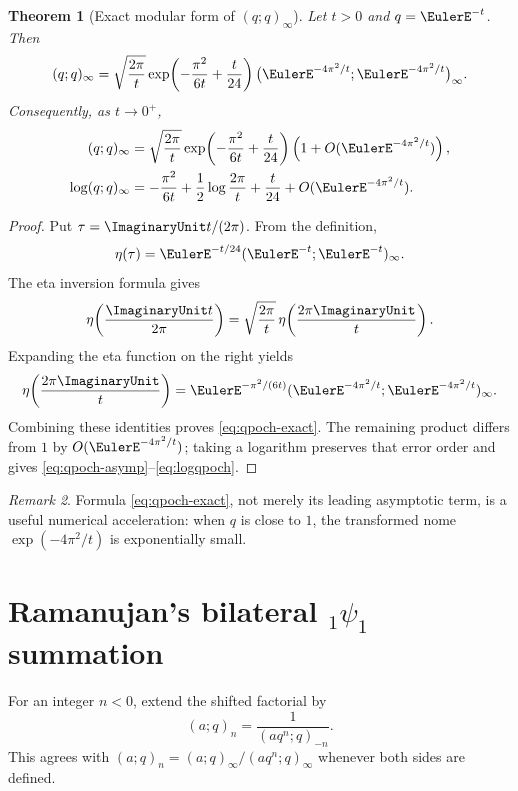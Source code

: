 \documentclass[11pt]{article}
\numberwithin{equation}{section}
\newtheorem{theorem}{Theorem}[section]
\theoremstyle{definition}
\theoremstyle{remark}
\newtheorem{remark}[theorem]{Remark}
\begin{document}
\begin{theorem}[Exact modular form of $(q;q)_\infty$]\label{thm:qpoch-asymp}
Let $t>0$ and $q=\EulerE^{-t}$.  Then
\begin{equation}\label{eq:qpoch-exact}
(q;q)_\infty
=\sqrt{\frac{2\pi}{t}}
\exp\!\left(-\frac{\pi^2}{6t}+\frac{t}{24}\right)
\bigl(\EulerE^{-4\pi^2/t};\EulerE^{-4\pi^2/t}\bigr)_\infty.
\end{equation}
Consequently, as $t\to0^+$,
\begin{align}
(q;q)_\infty
&=\sqrt{\frac{2\pi}{t}}
\exp\!\left(-\frac{\pi^2}{6t}+\frac{t}{24}\right)
\left(1+O(\EulerE^{-4\pi^2/t})\right),\label{eq:qpoch-asymp}\\
\log(q;q)_\infty
&=-\frac{\pi^2}{6t}+\frac12\log\frac{2\pi}{t}
+\frac{t}{24}+O(\EulerE^{-4\pi^2/t}).\label{eq:logqpoch}
\end{align}
\end{theorem}
\begin{proof}
Put $\tau=\ImaginaryUnit t/(2\pi)$.  From the definition,
\[
\eta(\tau)=\EulerE^{-t/24}(\EulerE^{-t};\EulerE^{-t})_\infty.
\]
The eta inversion formula gives
\[
\eta\!\left(\frac{\ImaginaryUnit t}{2\pi}\right)
=\sqrt{\frac{2\pi}{t}}\,
\eta\!\left(\frac{2\pi\ImaginaryUnit}{t}\right).
\]
Expanding the eta function on the right yields
\[
\eta\!\left(\frac{2\pi\ImaginaryUnit}{t}\right)
=\EulerE^{-\pi^2/(6t)}
(\EulerE^{-4\pi^2/t};\EulerE^{-4\pi^2/t})_\infty.
\]
Combining these identities proves \eqref{eq:qpoch-exact}.  The remaining
product differs from $1$ by $O(\EulerE^{-4\pi^2/t})$; taking a logarithm preserves
that error order and gives \eqref{eq:qpoch-asymp}--\eqref{eq:logqpoch}.
\end{proof}

\begin{remark}
Formula \eqref{eq:qpoch-exact}, not merely its leading asymptotic term, is a
useful numerical acceleration: when $q$ is close to $1$, the transformed nome
$\exp(-4\pi^2/t)$ is exponentially small.
\end{remark}

\section{Ramanujan's bilateral ${}_1\psi_1$ summation}

For an integer $n<0$, extend the shifted factorial by
\[
(a;q)_n=\frac1{(aq^n;q)_{-n}}.
\]
This agrees with $(a;q)_n=(a;q)_\infty/(aq^n;q)_\infty$ whenever both sides
are defined.
\end{document}
